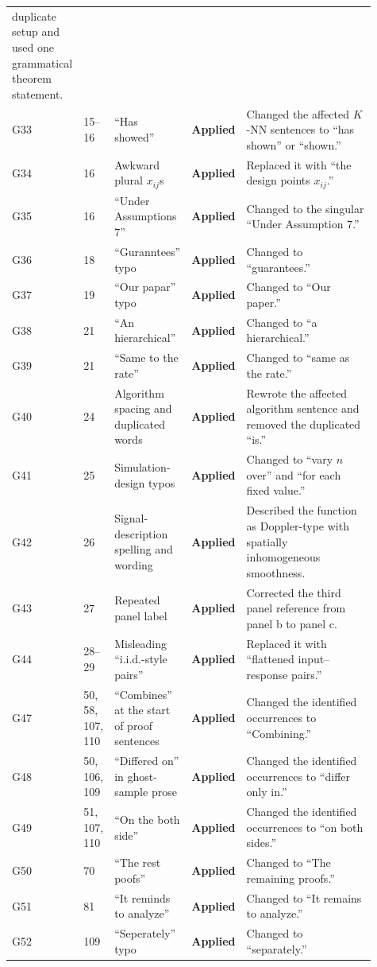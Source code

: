 \documentclass[10pt]{article}
\newcommand{\applied}{\textcolor{appliedgreen}{\textbf{Applied}}}
\begin{document}
\begin{landscape}
\begin{longtable}{L{0.045\linewidth}L{0.08\linewidth}L{0.21\linewidth}L{0.13\linewidth}L{0.445\linewidth}}
duplicate setup and used one grammatical theorem statement.\\
G33 & 15--16 & ``Has showed'' & \applied & Changed the affected
$K$-NN sentences to ``has shown'' or ``shown.''\\
G34 & 16 & Awkward plural $x_{ij}$s & \applied & Replaced it with ``the design
points $x_{ij}$.''\\
G35 & 16 & ``Under Assumptions 7'' & \applied & Changed to the
singular ``Under Assumption 7.''\\
G36 & 18 & ``Guranntees'' typo & \applied & Changed to ``guarantees.''\\
G37 & 19 & ``Our papar'' typo & \applied & Changed to ``Our
paper.''\\
G38 & 21 & ``An hierarchical'' & \applied & Changed to ``a hierarchical.''\\
G39 & 21 & ``Same to the rate'' & \applied & Changed to ``same
as the rate.''\\
G40 & 24 & Algorithm spacing and duplicated words & \applied & Rewrote the affected
algorithm sentence and removed the duplicated ``is.''\\
G41 & 25 & Simulation-design typos & \applied & Changed to
``vary $n$ over'' and ``for each fixed value.''\\
G42 & 26 & Signal-description spelling and wording & \applied & Described the
function as Doppler-type with spatially inhomogeneous smoothness.\\
G43 & 27 & Repeated panel label & \applied & Corrected the third
panel reference from panel b to panel c.\\
G44 & 28--29 & Misleading ``i.i.d.-style pairs'' & \applied & Replaced it with
``flattened input--response pairs.''\\
G47 & 50, 58, 107, 110 & ``Combines'' at the start of proof sentences &
\applied & Changed the identified occurrences to ``Combining.''\\
G48 & 50, 106, 109 & ``Differed on'' in ghost-sample prose & \applied & Changed the identified
occurrences to ``differ only in.''\\
G49 & 51, 107, 110 & ``On the both side'' & \applied & Changed the
identified occurrences to ``on both sides.''\\
G50 & 70 & ``The rest poofs'' & \applied & Changed to ``The remaining proofs.''\\
G51 & 81 & ``It reminds to analyze'' & \applied & Changed to
``It remains to analyze.''\\
G52 & 109 & ``Seperately'' typo & \applied & Changed to ``separately.''\\


\end{longtable}
\end{landscape}
\end{document}
